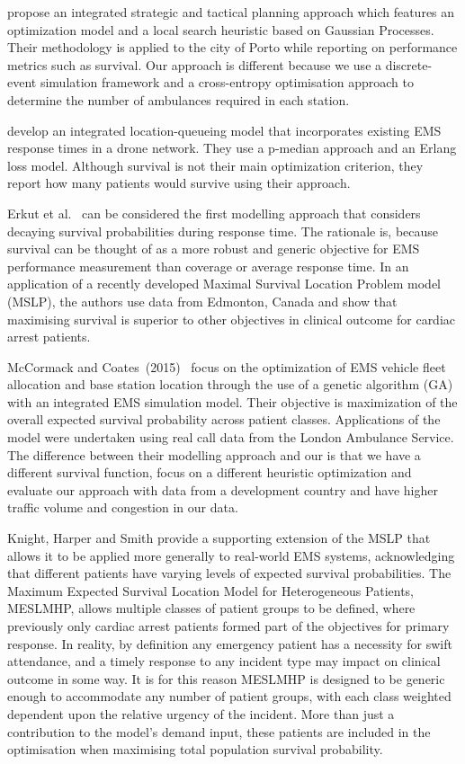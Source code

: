 \documentclass[preprint,12pt]{elsarticle}
\begin{document}
\citet{amorim2019integrated} propose an integrated strategic and tactical planning approach which features an optimization model and a local search heuristic based on Gaussian Processes.  Their methodology is applied to the city of Porto while reporting on performance metrics such as survival. Our approach is different because we use a discrete-event simulation framework and a cross-entropy optimisation approach to determine the number of ambulances required in each station. 

\citet{boutilier2022drone} develop an integrated location-queueing model that incorporates existing EMS response times in a drone network. They use a p-median approach and an Erlang loss model. Although survival is not their main optimization criterion,  they report how many patients would survive using their approach.

Erkut et al.~\cite{Erkut200842} can be considered the first modelling approach that considers decaying survival probabilities during response time.  The rationale is, because survival can be thought of as a more robust and generic objective for EMS performance measurement than coverage or average response time. In an application of a recently developed Maximal Survival Location Problem model (MSLP), the authors use data from Edmonton, Canada and show that maximising survival is superior to other objectives in clinical outcome for cardiac arrest patients.

McCormack and Coates~(2015)~\cite{MCormack2015} focus on the optimization of EMS vehicle fleet allocation and base station location through the use of a genetic algorithm (GA) with an integrated EMS simulation model. Their objective is maximization of the overall expected survival probability across patient classes. Applications of the model were undertaken using real call data from the London Ambulance Service. The difference between their modelling approach and our is that we have a different survival function, focus on a different heuristic optimization and evaluate our approach with data from a development country and have higher traffic volume and congestion in our data. 

Knight, Harper and Smith \cite{Knight2012918} provide a supporting extension of the MSLP that allows it to be applied more generally to real-world EMS systems, acknowledging that different patients have varying levels of expected survival probabilities.  The Maximum Expected Survival Location Model for Heterogeneous Patients, MESLMHP, allows multiple classes of patient groups to be defined, where previously only cardiac arrest patients formed part of the objectives for primary response.  In reality, by definition any emergency patient has a necessity for swift attendance, and a timely response to any incident type may impact on clinical outcome in some way. It is for this reason MESLMHP is designed to be generic enough to accommodate any number of patient groups, with each class weighted dependent upon the relative urgency of the incident.  More than just a contribution to the model’s demand input, these patients are included in the optimisation when maximising total population survival probability.
\end{document}
